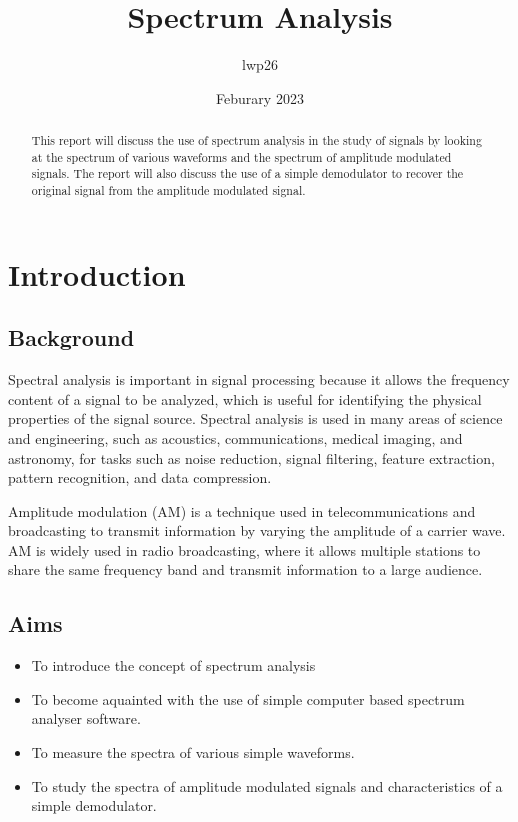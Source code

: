 \documentclass[12pt]{article}
\begin{document}
\title{Spectrum Analysis}
\author{lwp26}
\date{Feburary 2023}
\maketitle

\begin{abstract}
    \centering
    This report will discuss the use of spectrum analysis in the study of signals by looking at the spectrum of various waveforms and the spectrum of amplitude modulated signals. The report will also discuss the use of a simple demodulator to recover the original signal from the amplitude modulated signal.
\end{abstract}


\section{Introduction}

\subsection{Background}
Spectral analysis is important in signal processing because it allows the frequency content of a signal to be analyzed, which is useful for identifying the physical properties of the signal source. Spectral analysis is used in many areas of science and engineering, such as acoustics, communications, medical imaging, and astronomy, for tasks such as noise reduction, signal filtering, feature extraction, pattern recognition, and data compression.

Amplitude modulation (AM) is a technique used in telecommunications and broadcasting to transmit information by varying the amplitude of a carrier wave. AM is widely used in radio broadcasting, where it allows multiple stations to share the same frequency band and transmit information to a large audience.

\subsection{Aims}

\begin{itemize}
    \item To introduce the concept of spectrum analysis
    \item To become aquainted with the use of simple computer based spectrum analyser software.
    \item To measure the spectra of various simple waveforms.
    \item To study the spectra of amplitude modulated signals and characteristics of a simple demodulator.
\end{itemize}
\end{document}
